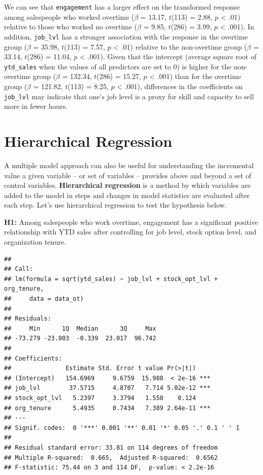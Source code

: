 \documentclass[
]{book}
\begin{document}
We can see that \texttt{engagement} has a larger effect on the transformed response among salespeople who worked overtime (\(\beta\) = 13.17, \(t\)(113) = 2.88, \(p\) \textless{} .01) relative to those who worked no overtime (\(\beta\) = 9.85, \(t\)(286) = 3.99, \(p\) \textless{} .001). In addition, \texttt{job\_lvl} has a stronger association with the response in the overtime group (\(\beta\) = 35.98, \(t\)(113) = 7.57, \(p\) \textless{} .01) relative to the non-overtime group (\(\beta\) = 33.14, \(t\)(286) = 11.04, \(p\) \textless{} .001). Given that the intercept (average square root of \texttt{ytd\_sales} when the values of all predictors are set to 0) is higher for the non-overtime group (\(\beta\) = 132.34, \(t\)(286) = 15.27, \(p\) \textless{} .001) than for the overtime group (\(\beta\) = 121.82, \(t\)(113) = 8.25, \(p\) \textless{} .001), differences in the coefficients on \texttt{job\_lvl} may indicate that one's job level is a proxy for skill and capacity to sell more in fewer hours.

\hypertarget{hierarchical-regression}{%
\section{Hierarchical Regression}\label{hierarchical-regression}}

A multiple model approach can also be useful for understanding the incremental value a given variable -- or set of variables -- provides above and beyond a set of control variables. \textbf{Hierarchical regression} is a method by which variables are added to the model in steps and changes in model statistics are evaluated after each step. Let's use hierarchical regression to test the hypothesis below.

\textbf{H1:} Among salespeople who work overtime, engagement has a significant positive relationship with YTD sales after controlling for job level, stock option level, and organization tenure.

\begin{verbatim}
## 
## Call:
## lm(formula = sqrt(ytd_sales) ~ job_lvl + stock_opt_lvl + org_tenure, 
##     data = data_ot)
## 
## Residuals:
##     Min      1Q  Median      3Q     Max 
## -73.279 -23.803  -0.339  23.017  96.742 
## 
## Coefficients:
##               Estimate Std. Error t value Pr(>|t|)    
## (Intercept)   154.6969     9.6759  15.988  < 2e-16 ***
## job_lvl        37.5715     4.8707   7.714 5.02e-12 ***
## stock_opt_lvl   5.2397     3.3794   1.550    0.124    
## org_tenure      5.4935     0.7434   7.389 2.64e-11 ***
## ---
## Signif. codes:  0 '***' 0.001 '**' 0.01 '*' 0.05 '.' 0.1 ' ' 1
## 
## Residual standard error: 33.81 on 114 degrees of freedom
## Multiple R-squared:  0.665,  Adjusted R-squared:  0.6562 
## F-statistic: 75.44 on 3 and 114 DF,  p-value: < 2.2e-16
\end{verbatim}
\end{document}
